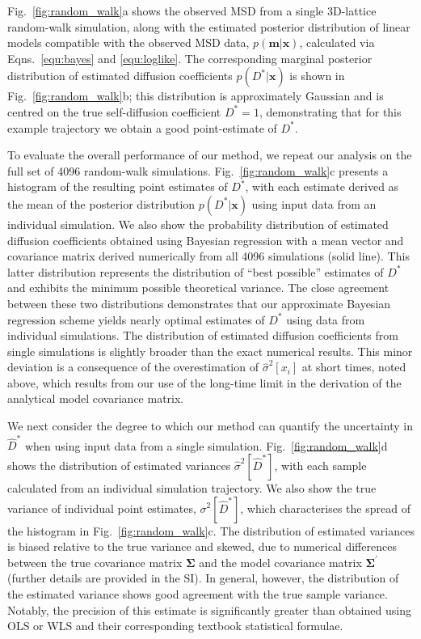 \documentclass[reprint,superscriptaddress,nobibnotes,amsmath,amssymb,aps,prx,hidelinks,linenumbers]{revtex4-2}
\newcommand{\oMSD}{\ensuremath{\bm{x}}}
\newcommand{\oMSDi}{\ensuremath{x_i}}
\newcommand{\model}{\bm{m}}
\newcommand{\prob}[1]{\ensuremath{p(#1)}}
\newcommand{\Dest}{\ensuremath{\widehat{D}^*}}
\newcommand{\D}{\ensuremath{D^*}}
\newcommand{\var}[1]{\ensuremath{\sigma^2[#1]}}
\newcommand{\varest}[1]{\ensuremath{\widehat{\sigma}^2[#1]}}
\begin{document}
Fig.~\ref{fig:random_walk}a shows the observed MSD from a single 3D-lattice random-walk simulation, along with the estimated posterior distribution of linear models compatible with the observed MSD data, $\prob{\model|\oMSD}$, calculated via Eqns.~\ref{equ:bayes} and \ref{equ:loglike}.
The corresponding marginal posterior distribution of estimated diffusion coefficients $\prob{\D|\oMSD}$ is shown in Fig.~\ref{fig:random_walk}b; this distribution is approximately Gaussian and is centred on the true self-diffusion coefficient $\D = \num{1}$, demonstrating that for this example trajectory we obtain a good point-estimate of $\D$.

To evaluate the overall performance of our method, we repeat our analysis on the full set of \num{4096} random-walk simulations.
Fig.~\ref{fig:random_walk}c presents a histogram of the resulting point estimates of $\D$, with each estimate derived as the mean of the posterior distribution $\prob{\D|\oMSD}$ using input data from an individual simulation.
We also show the probability distribution of estimated diffusion coefficients obtained using Bayesian regression with a mean vector and covariance matrix derived numerically from all \num{4096} simulations (solid line).
This latter distribution represents the distribution of ``best possible'' estimates of $\D$ and exhibits the minimum possible theoretical variance.
The close agreement between these two distributions demonstrates that our approximate Bayesian regression scheme yields nearly optimal estimates of $\D$ using data from individual simulations.
The distribution of estimated diffusion coefficients from single simulations is slightly broader than the exact numerical results.
This minor deviation is a consequence of the overestimation of $\varest{\oMSDi}$ at short times, noted above, which results from our use of the long-time limit in the derivation of the analytical model covariance matrix.

We next consider the degree to which our method can quantify the uncertainty in $\Dest$ when using input data from a single simulation.
Fig.~\ref{fig:random_walk}d shows the distribution of estimated variances $\varest{\Dest}$, with each sample calculated from an individual simulation trajectory.
We also show the true variance of individual point estimates, $\var{\Dest}$, which characterises the spread of the histogram in Fig.~\ref{fig:random_walk}c.
The distribution of estimated variances is biased relative to the true variance and skewed, due to numerical differences between the true covariance matrix $\mathbf{\Sigma}$ and the model covariance matrix $\mathbf{\Sigma^\prime}$ (further details are provided in the SI).
In general, however, the distribution of the estimated variance shows good agreement with the true sample variance.
Notably, the precision of this estimate is significantly greater than obtained using OLS or WLS and their corresponding textbook statistical formulae.
\end{document}
